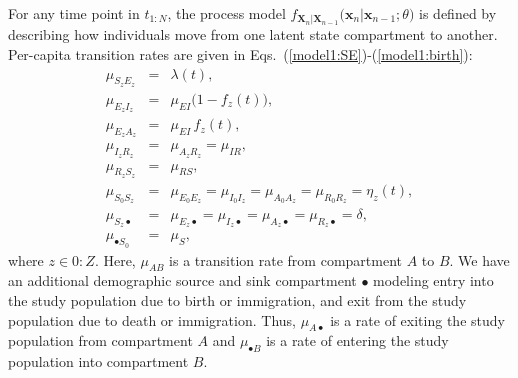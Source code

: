 \documentclass[10pt,letterpaper]{article}\usepackage[]{graphicx}\usepackage[table]{xcolor}
\newcommand\muIR{\mu_{IR}}
\newcommand\muEI{\mu_{EI}}
\newcommand\muRS{\mu_{RS}}
\newcommand\muBirth{\mu_S}
\newcommand\symptomFrac{f}
\newcommand\vaccClass{Z}
\newcommand\vaccCounter{z}
\newcommand\demography{\bullet}
\newcommand\paramVec{\theta}
\newcommand\myeqref[1]{(\ref{#1})}
\newcommand\seq[2]{{#1}\!:\!{#2}}
\begin{document}
For any time point in $t_{1:N}$, the process model $f_{\bm{X}_n|\bm{X}_{n-1}}\big(\bm{x}_{n}|\bm{x}_{n-1}; \paramVec\big)$ is defined by describing how individuals move from one latent state compartment to another.
Per-capita transition rates are given in Eqs.~\myeqref{model1:SE}-\myeqref{model1:birth}:
\begin{eqnarray}
\label{model1:SE}
\mu_{S_{\vaccCounter}E_{\vaccCounter}} &=& \lambda(t),
\\
\label{model1:EI}
\mu_{E_{\vaccCounter}I_{\vaccCounter}} &=& \muEI\big(1-\symptomFrac_\vaccCounter(t)\big),
\\
\label{model1:EA}
\mu_{E_{\vaccCounter}A_{\vaccCounter}} &=& \muEI\, \symptomFrac_\vaccCounter(t),
\\
\label{model1:toR}
\mu_{I_{\vaccCounter}R_{\vaccCounter}} &=& \mu_{A_{\vaccCounter}R_{\vaccCounter}} = \muIR,
\\
\label{model1:RS}
\mu_{R_{\vaccCounter}S_{\vaccCounter}} &=& \muRS,
\\
\label{model1:vacc}
\mu_{S_0S_{\vaccCounter}} &=& \mu_{E_0E_{\vaccCounter}} = \mu_{I_0I_{\vaccCounter}} = \mu_{A_0A_{\vaccCounter}} = \mu_{R_0R_{\vaccCounter}} = \eta_{\vaccCounter}(t),
\\
\label{model1:death}
\mu_{S_{\vaccCounter}\demography} &=& \mu_{E_{\vaccCounter}\demography} = \mu_{I_{\vaccCounter}\demography} = \mu_{A_{\vaccCounter}\demography}=\mu_{R_{\vaccCounter}\demography} = \delta,
\\
\label{model1:birth}
\mu_{\demography S_0} &=& \muBirth,
\end{eqnarray}
where $\vaccCounter\in \seq{0}{\vaccClass}$.
Here, $\mu_{AB}$ is a transition rate from compartment $A$ to $B$.
We have an additional demographic source and sink compartment $\demography$ modeling entry into the study population due to birth or immigration, and exit from the study population due to death or immigration.
Thus, $\mu_{A\demography}$ is a rate of exiting the study population from compartment $A$ and $\mu_{\demography B}$ is a rate of entering the study population into compartment $B$.
\end{document}
